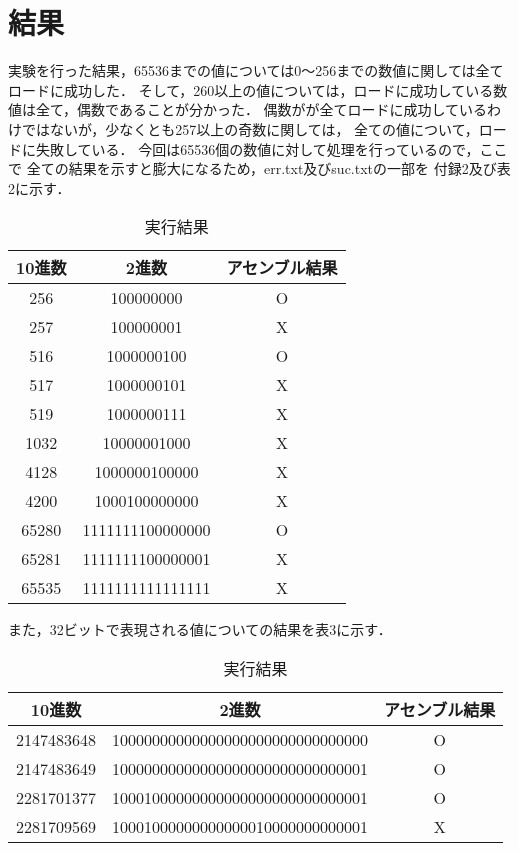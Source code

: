 \documentclass[a4j]{jarticle}
\begin{document}
\section{結果}
実験を行った結果，65536までの値については0〜256までの数値に関しては全てロードに成功した．
そして，260以上の値については，ロードに成功している数値は全て，偶数であることが分かった．
偶数がが全てロードに成功しているわけではないが，少なくとも257以上の奇数に関しては，
全ての値について，ロードに失敗している．
今回は65536個の数値に対して処理を行っているので，ここで
全ての結果を示すと膨大になるため，err.txt及びsuc.txtの一部を
付録2及び表2に示す．
\begin{table}[H]
  \centering
  \caption{実行結果}
  \begin{tabular}{|c|c|c|}
    \hline
    10進数 & 2進数 & アセンブル結果\\
    \hline
    256 & 100000000 & O \\
    \hline
    257 & 100000001 & X \\
    \hline
    516 & 1000000100 & O \\
    \hline
    517 & 1000000101 & X \\
    \hline
    519 & 1000000111 & X \\
    \hline
    1032 & 10000001000 & X \\
    \hline
    4128 & 1000000100000 & X \\
    \hline
    4200 & 1000100000000 & X \\
    \hline
    65280 & 1111111100000000 & O \\
    \hline
    65281 & 1111111100000001 & X \\
    \hline
    65535 & 1111111111111111 & X \\
    \hline
  \end{tabular}
\end{table}
また，32ビットで表現される値についての結果を表3に示す．
\begin{table}[H]
  \centering
  \caption{実行結果}
  \begin{tabular}{|c|c|c|}
    \hline
    10進数 & 2進数& アセンブル結果\\
    \hline
    2147483648 & 10000000000000000000000000000000 & O \\
    \hline
    2147483649 & 10000000000000000000000000000001 & O \\
    \hline
    2281701377 & 10001000000000000000000000000001 & O \\
    \hline
    2281709569 & 10001000000000000010000000000001 & X \\
    \hline

    
  \end{tabular}
\end{table}
\end{document}
